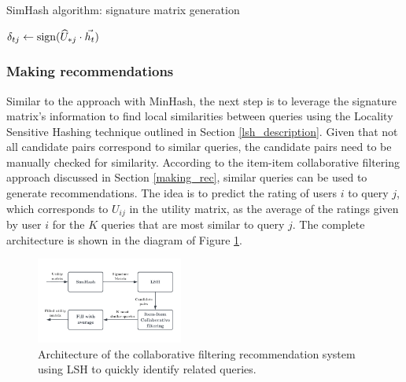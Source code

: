 \begin{algorithm}[h]
    \caption{SimHash algorithm: signature matrix generation} 
    \begin{algorithmic}[1]
                \State $\delta_{tj} \gets \operatorname{sign}(\widehat{U}_{*j} \cdot \vec{h_t})$
            \EndFor
        \EndFor
    \end{algorithmic} 
    \label{simhash_alg}
\end{algorithm}

\subsubsection{Making recommendations} Similar to the approach with MinHash, the next step is to leverage the signature matrix's information to find local similarities between queries using the Locality Sensitive Hashing technique outlined in Section \ref{lsh_description}. Given that not all candidate pairs correspond to similar queries, the candidate pairs need to be manually checked for similarity. According to the item-item collaborative filtering approach discussed in Section \ref{making_rec}, similar queries can be used to generate recommendations. The idea is to predict the rating of users $i$ to query $j$, which corresponds to $U_{ij}$ in the utility matrix, as the average of the ratings given by user $i$ for the $K$ queries that are most similar to query $j$. The complete architecture is shown in the diagram of Figure \ref{fig:cf_lsh}.
\begin{figure}[H]
    \centering
    \includegraphics[width=0.43\textwidth]{imgs/cf_lsh_diagram.pdf}
    \caption{\normalfont Architecture of the collaborative filtering recommendation system using LSH to quickly identify related queries.}
    \label{fig:cf_lsh}
\end{figure}

